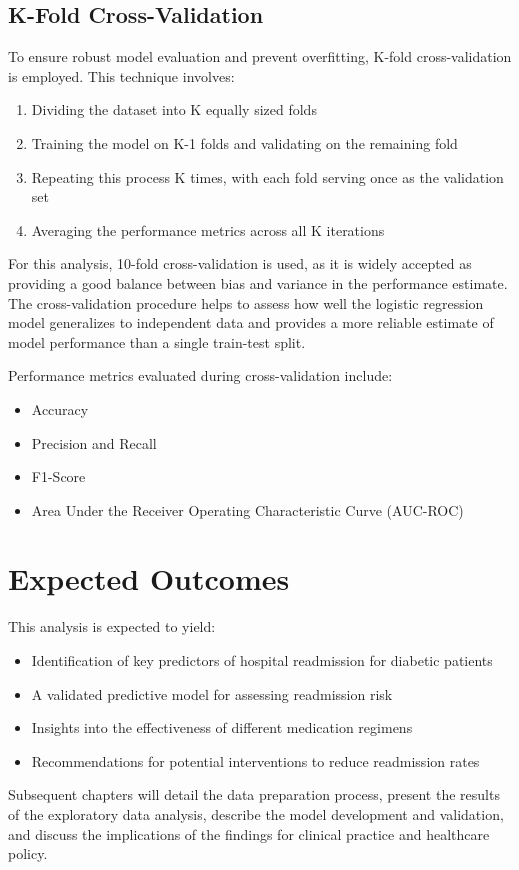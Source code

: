 \subsection{K-Fold Cross-Validation}
\label{sec:kfold}

To ensure robust model evaluation and prevent overfitting, K-fold cross-validation is employed. This technique involves:

\begin{enumerate}
    \item Dividing the dataset into K equally sized folds
    \item Training the model on K-1 folds and validating on the remaining fold
    \item Repeating this process K times, with each fold serving once as the validation set
    \item Averaging the performance metrics across all K iterations
\end{enumerate}

For this analysis, 10-fold cross-validation is used, as it is widely accepted as providing a good balance between bias and variance in the performance estimate. The cross-validation procedure helps to assess how well the logistic regression model generalizes to independent data and provides a more reliable estimate of model performance than a single train-test split.

Performance metrics evaluated during cross-validation include:
\begin{itemize}
    \item Accuracy
    \item Precision and Recall
    \item F1-Score
    \item Area Under the Receiver Operating Characteristic Curve (AUC-ROC)
\end{itemize}

\section{Expected Outcomes}

This analysis is expected to yield:
\begin{itemize}
    \item Identification of key predictors of hospital readmission for diabetic patients
    \item A validated predictive model for assessing readmission risk
    \item Insights into the effectiveness of different medication regimens
    \item Recommendations for potential interventions to reduce readmission rates
\end{itemize}

Subsequent chapters will detail the data preparation process, present the results of the exploratory data analysis, describe the model development and validation, and discuss the implications of the findings for clinical practice and healthcare policy. 